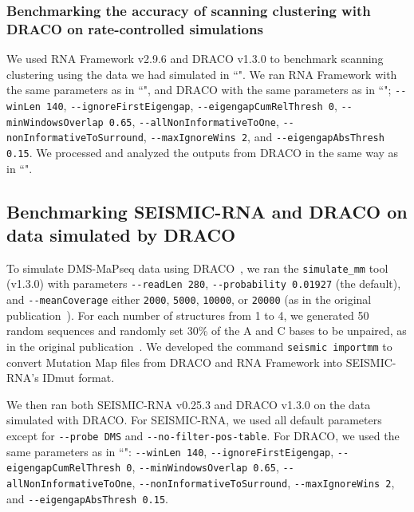 \documentclass[unnumsec,webpdf,contemporary,large]{oup-authoring-template}%
\theoremstyle{thmstyleone}%
\theoremstyle{thmstyletwo}%
\theoremstyle{thmstylethree}%
\begin{document}
\subsubsection{Benchmarking the accuracy of scanning clustering with DRACO on rate-controlled simulations}

We used RNA Framework v2.9.6 and DRACO v1.3.0 to benchmark scanning clustering using the data we had simulated in ``".
We ran RNA Framework with the same parameters as in ``", and DRACO with the same parameters as in ``"; \verb|--winLen 140|, \verb|--ignoreFirstEigengap|, \verb|--eigengapCumRelThresh 0|, \verb|--minWindowsOverlap 0.65|, \verb|--allNonInformativeToOne|, \verb|--nonInformativeToSurround|, \verb|--maxIgnoreWins 2|, and \verb|--eigengapAbsThresh 0.15|.
We processed and analyzed the outputs from DRACO in the same way as in ``".


\subsection{Benchmarking SEISMIC-RNA and DRACO on data simulated by DRACO}
\label{simulate-mm}

To simulate DMS-MaPseq data using DRACO~\cite{Morandi2021}, we ran the \verb|simulate_mm| tool (v1.3.0) with parameters \verb|--readLen 280|, \verb|--probability 0.01927| (the default), and \verb|--meanCoverage| either \verb|2000|, \verb|5000|, \verb|10000|, or \verb|20000| (as in the original publication~\cite{Morandi2021}).
For each number of structures from 1 to 4, we generated 50 random sequences and randomly set 30\% of the A and C bases to be unpaired, as in the original publication~\cite{Morandi2021}.
We developed the command \verb|seismic importmm| to convert Mutation Map files from DRACO and RNA Framework into SEISMIC-RNA's IDmut format.

We then ran both SEISMIC-RNA v0.25.3 and DRACO v1.3.0 on the data simulated with DRACO.
For SEISMIC-RNA, we used all default parameters except for \verb|--probe DMS| and \verb|--no-filter-pos-table|.
For DRACO, we used the same parameters as in ``": \verb|--winLen 140|, \verb|--ignoreFirstEigengap|, \verb|--eigengapCumRelThresh 0|, \verb|--minWindowsOverlap 0.65|, \verb|--allNonInformativeToOne|, \verb|--nonInformativeToSurround|, \verb|--maxIgnoreWins 2|, and \verb|--eigengapAbsThresh 0.15|.
\end{document}
